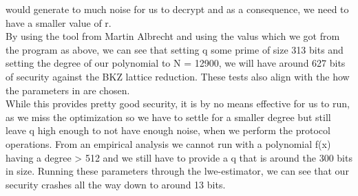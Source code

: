 \documentclass[../main.tex]{subfiles}
\begin{document}
	would generate to much noise for us to decrypt and as a consequence, we need to have a smaller value of r.
	\\[5mm]
    By using the tool from Martin Albrecht %
    and using the valus which we got from the program as above, we can see that setting q some prime
    of size 313 bits and setting the degree of our polynomial to N = 12900, we will have around 627 bits
    of security against the BKZ lattice reduction.
    These tests also align with the how the parameters in \cite{damgaard2012multiparty} are chosen.
    \\[5mm]
    While this provides pretty good security, it is by no means effective for us to run, as we miss the optimization %
    so we have to settle for a smaller degree but still leave q high enough to not have enough noise, when 
    we perform the protocol operations.
    From an empirical analysis we cannot run with a polynomial f(x) having a degree > 512 and we still have to provide a q that is
    around the 300 bits in size.
    Running these parameters through the lwe-estimator, we can see that our security crashes all the way
    down to around 13 bits. %
\end{document}
